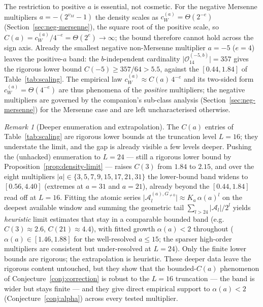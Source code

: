 \documentclass[11pt,reqno]{amsart}
\theoremstyle{plain}
\theoremstyle{definition}
\theoremstyle{remark}
\newtheorem{remark}[theorem]{Remark}
\newcommand{\Obs}{\mathcal{O}}
\newcommand{\Atom}{\mathcal{A}}
\newcommand{\cWa}{c_{W}^{(a)}}
\begin{document}
The restriction to positive $a$ is essential, not cosmetic. For the
negative Mersenne multipliers $a = -(2^{v_M} - 1)$ the density scales as
$\cWa = \Theta(2^{-e})$ (Section~\ref{sec:neg-mersenne}), the square root
of the positive scale, so $C(a) = \cWa/4^{-e} = \Theta(2^{e}) \to \infty$;
the bound therefore cannot hold across the sign axis. Already the smallest
negative non-Mersenne multiplier $a = -5$ ($e = 4$) leaves the
positive-$a$ band: the $b$-independent cardinality
$\lvert \Obs_{14}^{(-5,b)} \rvert = 357$ gives the rigorous lower bound
$C(-5) \ge 357/64 > 5.5$, against the $[0.44, 1.84]$ of
Table~\ref{tab:scaling}. The empirical law $\cWa \approx C(a)\,4^{-e}$ and
its two-sided form $\cWa = \Theta(4^{-e})$ are thus phenomena of the
\emph{positive} multipliers; the negative multipliers are governed by the
companion's sub-class analysis (Section~\ref{sec:neg-mersenne}) for the
Mersenne case and are left uncharacterised otherwise.

\begin{remark}[Deeper enumeration and extrapolation]\label{rem:deep-scaling}
The $C(a)$ entries of Table~\ref{tab:scaling} are rigorous lower bounds at
the truncation level $L = 16$; they understate the limit, and the gap is
already visible a few levels deeper. Pushing the (unhacked) enumeration to
$L = 24$ --- still a rigorous lower bound by
Proposition~\ref{prop:density-limit} --- raises $C(3)$ from $1.84$ to
$2.15$, and over the eight multipliers
$\lvert a \rvert \in \{3, 5, 7, 9, 15, 17, 21, 31\}$ the lower-bound band
widens to $[0.56, 4.40]$ (extremes at $a = 31$ and $a = 21$), already
beyond the $[0.44, 1.84]$ read off at $L = 16$. Fitting the atomic series
$\lvert \Atom_l^{(a), G_{\ne 0}} \rvert \approx K_a\,\alpha(a)^l$ on the
deepest available window and summing the geometric tail
$\sum_{l > 24} \lvert \Atom_l \rvert / 2^l$ yields \emph{heuristic} limit
estimates that stay in a comparable bounded band (e.g.\ $C(3) \approx 2.6$,
$C(21) \approx 4.4$), with fitted growth $\alpha(a) < 2$ throughout
($\alpha(a) \in [1.46, 1.88]$ for the well-resolved $a \le 15$; the sparser
high-order multipliers are consistent but under-resolved at $L = 24$). Only
the finite lower bounds are rigorous; the extrapolation is heuristic. These
deeper data leave the rigorous content untouched, but they show that the
bounded-$C(a)$ phenomenon of Conjecture~\ref{conj:correction} is robust to
the $L = 16$ truncation --- the band is wider but stays finite --- and they
give direct empirical support to $\alpha(a) < 2$
(Conjecture~\ref{conj:alpha}) across every tested multiplier.
\end{remark}
\end{document}
